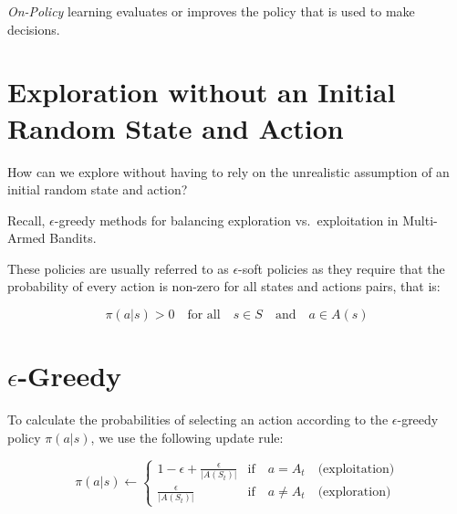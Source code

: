 \documentclass[
  letterpaper,
  DIV=11,
  numbers=noendperiod]{scrreprt}
\begin{document}
\begin{tcolorbox}[enhanced jigsaw, toprule=.15mm, leftrule=.75mm, coltitle=black, left=2mm, opacityback=0, titlerule=0mm, arc=.35mm, toptitle=1mm, opacitybacktitle=0.6, bottomtitle=1mm, colframe=quarto-callout-tip-color-frame, title=\textcolor{quarto-callout-tip-color}{\faLightbulb}\hspace{0.5em}{On-Policy Learning}, rightrule=.15mm, bottomrule=.15mm, colbacktitle=quarto-callout-tip-color!10!white, breakable, colback=white]

\emph{On-Policy} learning evaluates or improves the policy that is used
to make decisions.

\end{tcolorbox}

\section{Exploration without an Initial Random State and
Action}\label{exploration-without-an-initial-random-state-and-action}

How can we explore without having to rely on the unrealistic assumption
of an initial random state and action?

Recall, \(\epsilon\)-greedy methods for balancing exploration
vs.~exploitation in Multi-Armed Bandits.

These policies are usually referred to as \(\epsilon\)-soft policies as
they require that the probability of every action is non-zero for all
states and actions pairs, that is:

\[
\pi(a|s) > 0 \quad \text{for all} \quad s \in S \quad \text{and} \quad a \in A(s)
\]

\section{\texorpdfstring{\(\epsilon\)-Greedy}{\textbackslash epsilon-Greedy}}\label{epsilon-greedy}

To calculate the probabilities of selecting an action according to the
\(\epsilon\)-greedy policy \(\pi(a|s)\), we use the following update
rule:

\[
\pi(a|s) \gets \begin{cases}
1 - \epsilon + \frac{\epsilon}{|A(S_{t})|}  & \text{if} \quad a = A_{t} \quad \text{(exploitation)} \\
\frac{\epsilon}{|A(S_{t})|} & \text{if} \quad a \neq A_{t} \quad \text{(exploration)}
\end{cases}
\]
\end{document}
